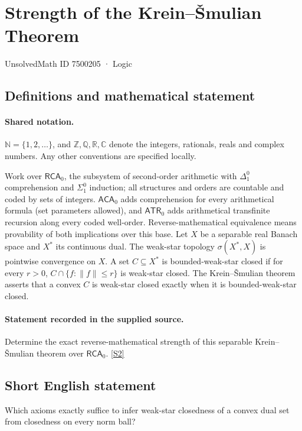\documentclass[11pt]{article}
\newcommand{\sref}[2]{\hyperlink{source:#1:#2}{[S#2]}}
\begin{document}
\setcounter{section}{7500204}
\section{Strength of the Krein–Šmulian Theorem}\label{7500205}
{\small\sffamily UnsolvedMath ID 7500205 · Logic}
\subsection{Definitions and mathematical statement}

\paragraph{Shared notation.}$\mathbb N=\{1,2,\ldots\}$, and $\mathbb Z,\mathbb Q,\mathbb R,\mathbb C$ denote the integers, rationals, reals and complex numbers. Any other conventions are specified locally.


Work over $\mathsf{RCA}_0$, the subsystem of second-order arithmetic with $\Delta^0_1$ comprehension and $\Sigma^0_1$ induction; all structures and orders are countable and coded by sets of integers. $\mathsf{ACA}_0$ adds comprehension for every arithmetical formula (set parameters allowed), and $\mathsf{ATR}_0$ adds arithmetical transfinite recursion along every coded well-order. Reverse-mathematical equivalence means provability of both implications over this base. Let $X$ be a separable real Banach space and $X^*$ its continuous dual. The weak-star topology $\sigma(X^*,X)$ is pointwise convergence on $X$. A set $C\subseteq X^*$ is bounded-weak-star closed if for every $r>0$, $C\cap\{f:\|f\|\le r\}$ is weak-star closed. The Krein--\v Smulian theorem asserts that a convex $C$ is weak-star closed exactly when it is bounded-weak-star closed.
\paragraph{Statement recorded in the supplied source.}
Determine the exact reverse-mathematical strength of this separable Krein--\v Smulian theorem over $\mathsf{RCA}_0$. \sref{7500205}{2}
\subsection{Short English statement}
Which axioms exactly suffice to infer weak-star closedness of a convex dual set from closedness on every norm ball?
\end{document}
